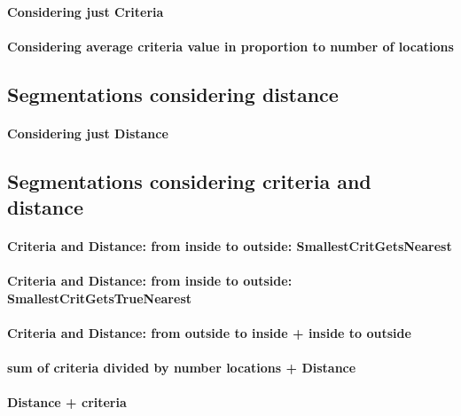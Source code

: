 \paragraph{Considering just Criteria}

\paragraph{Considering average criteria value in proportion to number of locations}

\subsection{Segmentations considering distance}

\paragraph{Considering just Distance}

\subsection{Segmentations considering criteria and distance}

\paragraph{Criteria and Distance: from inside to outside: SmallestCritGetsNearest}

\paragraph{Criteria and Distance: from inside to outside: SmallestCritGetsTrueNearest}

\paragraph{Criteria and Distance: from outside to inside + inside to outside}

\paragraph{sum of criteria divided by number locations + Distance}

\paragraph{Distance + criteria}

